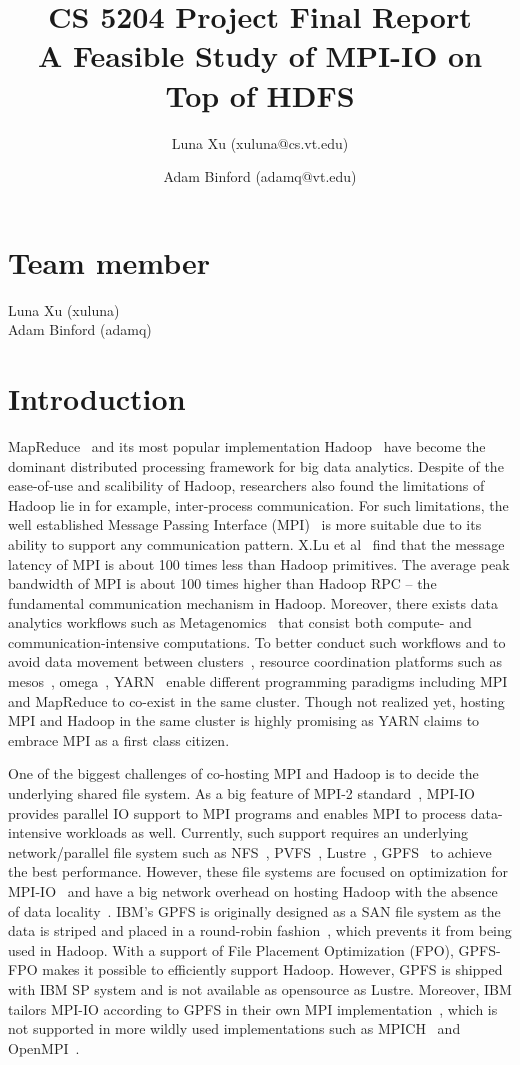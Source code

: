 \documentclass[11pt,titlepage]{article}
\author{Luna Xu (xuluna@cs.vt.edu) \and Adam Binford (adamq@vt.edu)}
\title{CS 5204 Project Final Report \\ A Feasible Study of MPI-IO on Top of HDFS}
\begin{document}
\maketitle

\section{Team member}
Luna Xu (xuluna)\\
Adam Binford (adamq)

\section{Introduction}
MapReduce~\cite{mr} and its most popular implementation Hadoop~\cite{hadoop}
have become the dominant distributed processing framework for big data
analytics. Despite of the ease-of-use and scalibility of Hadoop, researchers
also found the limitations of Hadoop lie in for example, inter-process
communication. For such limitations, the well established Message Passing
Interface (MPI)~\cite{mpi} is more suitable due to its ability to support any
communication pattern. X.Lu et al~\cite{xlu} find that  the
message latency of MPI is about 100 times less than Hadoop
primitives. The average peak bandwidth of MPI is about
100 times higher than Hadoop RPC -- the fundamental communication
mechanism in Hadoop. Moreover, there exists data analytics workflows such as
Metagenomics~\cite{meta} that consist both compute- and communication-intensive
computations. To better conduct such workflows and to avoid data
movement between clusters~\cite{???}, resource coordination platforms such as
mesos~\cite{mesos}, omega~\cite{omega}, YARN~\cite{yarn} enable different
programming paradigms including MPI and MapReduce to co-exist in the same
cluster. Though not realized yet, hosting MPI and Hadoop in the same cluster is
highly promising as YARN claims to embrace MPI as a first class citizen.

One of the biggest challenges of co-hosting MPI and Hadoop is to decide the underlying shared file
system. As a big feature of MPI-2 standard~\cite{mpi}, MPI-IO provides parallel
IO support to MPI programs and enables MPI to process data-intensive workloads
as well. Currently, such support requires an underlying network/parallel file
system such as NFS~\cite{nfs1}, PVFS~\cite{pvfs}, Lustre~\cite{lustre},
GPFS~\cite{gpfs} to achieve the best performance. However, these file systems
are focused on optimization for MPI-IO~\cite{mpipvfs, mpilustre1, mpigpfs} and
have a big network overhead on hosting Hadoop with the absence of data
locality~\cite{hadooplustre}. IBM's GPFS is originally designed as a SAN file
system as the data is striped and placed in a round-robin fashion~\cite{gpfs},
which prevents it from being used in Hadoop. With a support of File Placement
Optimization (FPO), GPFS-FPO makes it possible to efficiently support Hadoop.
However, GPFS is shipped with IBM SP system and is not available as opensource
as Lustre. Moreover, IBM tailors MPI-IO according to GPFS in their own MPI
implementation~\cite{mpigpfs}, which is not supported in more wildly used
implementations such as MPICH~\cite{} and OpenMPI~\cite{openmpi}.
\end{document}
